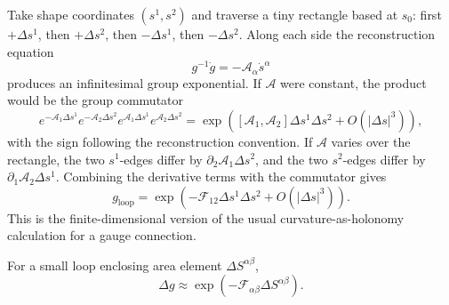 \begin{derivation}
Take shape coordinates \((s^1,s^2)\) and traverse a tiny rectangle based at
\(s_0\): first \(+\Delta s^1\), then \(+\Delta s^2\), then
\(-\Delta s^1\), then \(-\Delta s^2\). Along each side the reconstruction
equation
\[
  g^{-1}\dot g=-\mathcal A_\alpha\dot s^\alpha
\]
produces an infinitesimal group exponential. If \(\mathcal A\) were constant,
the product would be the group commutator
\[
  e^{-\mathcal A_1\Delta s^1}
  e^{-\mathcal A_2\Delta s^2}
  e^{\mathcal A_1\Delta s^1}
  e^{\mathcal A_2\Delta s^2}
  =
  \exp\left(
    [\mathcal A_1,\mathcal A_2]\Delta s^1\Delta s^2
    +O(|\Delta s|^3)
  \right),
\]
with the sign following the reconstruction convention. If \(\mathcal A\) varies
over the rectangle, the two \(s^1\)-edges differ by
\(\partial_2\mathcal A_1\Delta s^2\), and the two \(s^2\)-edges differ by
\(\partial_1\mathcal A_2\Delta s^1\). Combining the derivative terms with the
commutator gives
\[
  g_{\mathrm{loop}}
  =
  \exp\left(
    -\mathcal F_{12}\Delta s^1\Delta s^2
    +O(|\Delta s|^3)
  \right).
\]
This is the finite-dimensional version of the usual curvature-as-holonomy
calculation for a gauge connection.
\end{derivation}

For a small loop enclosing area element
\(\Delta S^{\alpha\beta}\),
\[
  \Delta g
  \approx
  \exp\left(
    -\mathcal F_{\alpha\beta}\Delta S^{\alpha\beta}
  \right).
\]

